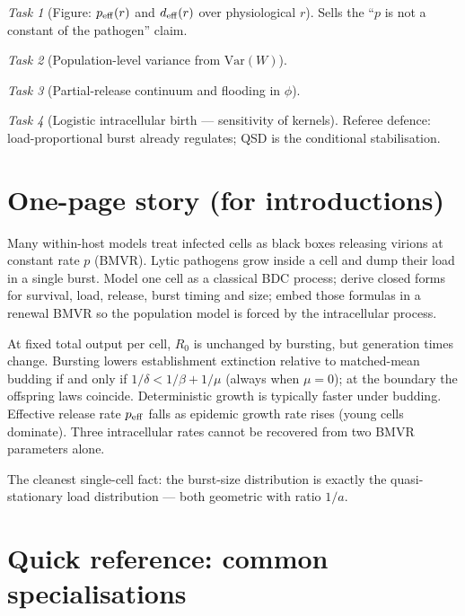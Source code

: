 \documentclass[11pt,a4paper]{article}
\theoremstyle{plain}
\theoremstyle{definition}
\theoremstyle{remark}
\newtheorem{task}{Task}[section]
\begin{document}
\begin{task}[Figure: $p_{\rm eff}(r)$ and $d_{\rm eff}(r)$ over physiological $r$]
Sells the ``$p$ is not a constant of the pathogen'' claim.
\end{task}

\begin{task}[Population-level variance from $\mathrm{Var}(W)$]
\end{task}

\begin{task}[Partial-release continuum and flooding in $\phi$]
\end{task}

\begin{task}[Logistic intracellular birth --- sensitivity of kernels]
Referee defence: load-proportional burst already regulates; QSD is the
conditional stabilisation.
\end{task}

\section{One-page story (for introductions)}

Many within-host models treat infected cells as black boxes releasing virions at
constant rate $p$ (BMVR). Lytic pathogens grow inside a cell and dump their load
in a single burst. Model one cell as a classical BDC process; derive closed forms
for survival, load, release, burst timing and size; embed those formulas in a
renewal BMVR so the population model is forced by the intracellular process.

At fixed total output per cell, $R_0$ is unchanged by bursting, but generation
times change. Bursting lowers establishment extinction relative to matched-mean
budding if and only if $1/\delta<1/\beta+1/\mu$ (always when $\mu=0$); at the
boundary the offspring laws coincide. Deterministic growth is typically faster
under budding. Effective release rate $p_{\rm eff}$ falls as epidemic growth rate
rises (young cells dominate). Three intracellular rates cannot be recovered from
two BMVR parameters alone.

The cleanest single-cell fact: the burst-size distribution is exactly the
quasi-stationary load distribution --- both geometric with ratio $1/a$.

\clearpage
\appendix
\section{Quick reference: common specialisations}
\end{document}
